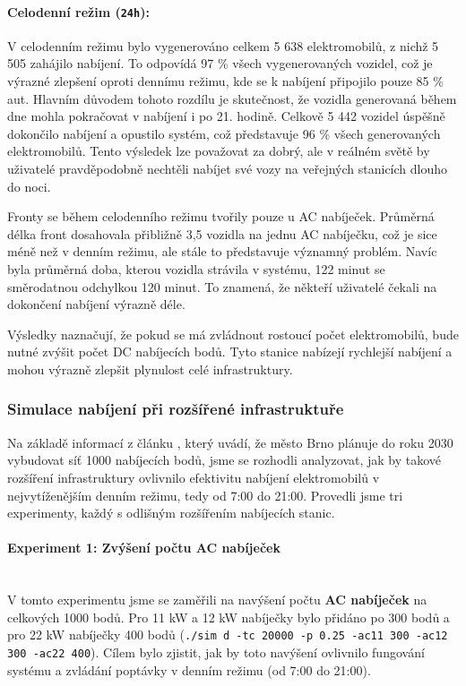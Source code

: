 \documentclass[a4paper,11pt]{article}
\begin{document}
\paragraph{Celodenní režim (\texttt{24h}):} 
V celodenním režimu bylo vygenerováno celkem 5 638 elektromobilů, z nichž 5 505 zahájilo nabíjení. To odpovídá 97 \% všech vygenerovaných vozidel, což je výrazné zlepšení oproti dennímu režimu, kde se k nabíjení připojilo pouze 85 \% aut. Hlavním důvodem tohoto rozdílu je skutečnost, že vozidla generovaná během dne mohla pokračovat v nabíjení i po 21. hodině. Celkově 5 442 vozidel úspěšně dokončilo nabíjení a opustilo systém, což představuje 96 \% všech generovaných elektromobilů. Tento výsledek lze považovat za dobrý, ale v reálném světě by uživatelé pravděpodobně nechtěli nabíjet své vozy na veřejných stanicích dlouho do noci.

Fronty se během celodenního režimu tvořily pouze u AC nabíječek. Průměrná délka front dosahovala přibližně 3,5 vozidla na jednu AC nabíječku, což je sice méně než v denním režimu, ale stále to představuje významný problém. Navíc byla průměrná doba, kterou vozidla strávila v systému, 122 minut se směrodatnou odchylkou 120 minut. To znamená, že někteří uživatelé čekali na dokončení nabíjení výrazně déle.

Výsledky naznačují, že pokud se má zvládnout rostoucí počet elektromobilů, bude nutné zvýšit počet DC nabíjecích bodů. Tyto stanice nabízejí rychlejší nabíjení a mohou výrazně zlepšit plynulost celé infrastruktury.


\subsubsection{Simulace nabíjení při rozšířené infrastruktuře}

Na základě informací z článku \cite{ev_growth}, který uvádí, že město Brno plánuje do roku 2030 vybudovat síť 1000 nabíjecích bodů, jsme se rozhodli analyzovat, jak by takové rozšíření infrastruktury ovlivnilo efektivitu nabíjení elektromobilů v nejvytíženějším denním režimu, tedy od 7:00 do 21:00. Provedli jsme tri experimenty, každý s odlišným rozšířením nabíjecích stanic.


\paragraph{Experiment 1: Zvýšení počtu AC nabíječek\\\\}
V tomto experimentu jsme se zaměřili na navýšení počtu \textbf{AC nabíječek} na celkových 1000 bodů. Pro 11 kW a 12 kW nabíječky bylo přidáno po 300 bodů a pro 22 kW nabíječky 400 bodů (\texttt{./sim d -tc 20000 -p 0.25 -ac11 300 -ac12 300 -ac22 400}). Cílem bylo zjistit, jak by toto navýšení ovlivnilo fungování systému a zvládání poptávky v denním režimu (od 7:00 do 21:00).
\end{document}
